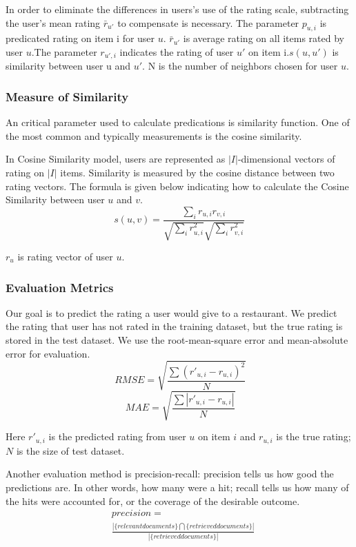 \documentclass[conference]{IEEEtran}
\begin{document}
In order to eliminate the differences in users's use of the rating scale, subtracting the user's mean rating ${\bar r_{u'}}$ to compensate is necessary.   The parameter $p_{u,i}$ is predicated rating on item i for user $u$.  ${\bar r_{u'}}$ is average rating on all items rated by user $u$.The parameter $r_{u',i}$ indicates the rating of user $u'$ on item i.$s(u,u')$ is similarity between user u and $u'$. N is the number of neighbors chosen for user $u$.  

\subsubsection{Measure of Similarity}
An critical parameter used to calculate predications is similarity function. One of the most common and typically measurements is the cosine similarity. 

In Cosine Similarity model, users are represented as $|\textit{I}|$-dimensional vectors of rating on $|\textit{I}|$ items. Similarity is measured by the cosine distance between two rating vectors. The formula is given below indicating how to calculate the Cosine Similarity between user $u$ and $v$. 
\begin{equation}
s(u,v) = \frac{\sum\nolimits_{i} r_{u,i}r_{v,i}}{\sqrt{\sum\nolimits_{i} {r^{2}_{u,i}}} \sqrt{\sum\nolimits_{i} {r^{2}_{v,i}}}} 
\end{equation}

$r_u$ is rating vector of user $u$.

\subsubsection{Evaluation Metrics}
Our goal is to predict the rating a user would give to a restaurant. We predict the rating that user has not rated in the training dataset, but the true rating is stored in the test dataset. We use the root-mean-square error and mean-absolute error for evaluation.
\begin{equation}
\ RMSE = \sqrt{\frac{\sum{\left(r'_{u,i} - r_{u,i}\right)}^2}{N}}
\end{equation}
\begin{equation}
\ MAE = \sqrt{\frac{\sum{\left|r'_{u,i} - r_{u,i}\right|}}{N}}
\end{equation}

Here $r'_{u,i}$ is the predicted rating from user $u$ on item $i$ and $r_{u,i}$ is the true rating; $N$ is the size of test dataset. 

Another evaluation method is precision-recall: precision tells us how good the predictions are. In other words, how many were a hit; recall tells us how many of the hits were accounted for, or the coverage of the desirable outcome.
\begin{equation}
\begin{split}
& precision = \\
& \frac{\left|\{relevant documents\}\bigcap \{retrieved documents\}\right|}{\left|\{retrieved documents\}\right|}
\end{split}
\end{equation}
\end{document}
